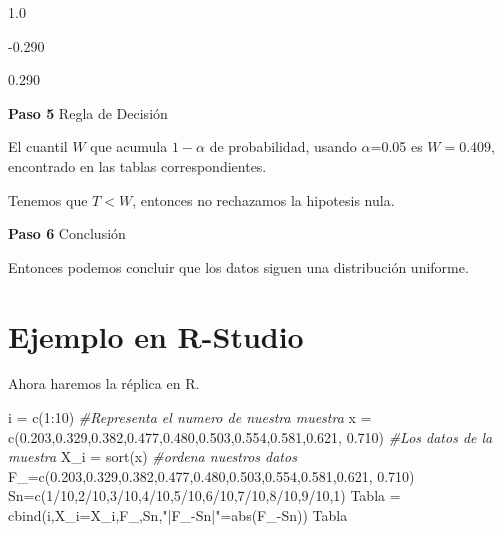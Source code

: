 \documentclass[
  a4paper,
  oneside,
  openany]{book}
\newenvironment{Shaded}{\begin{snugshade}}{\end{snugshade}}
\newcommand{\AttributeTok}[1]{\textcolor[rgb]{0.77,0.63,0.00}{#1}}
\newcommand{\CommentTok}[1]{\textcolor[rgb]{0.56,0.35,0.01}{\textit{#1}}}
\newcommand{\DecValTok}[1]{\textcolor[rgb]{0.00,0.00,0.81}{#1}}
\newcommand{\FloatTok}[1]{\textcolor[rgb]{0.00,0.00,0.81}{#1}}
\newcommand{\FunctionTok}[1]{\textcolor[rgb]{0.00,0.00,0.00}{#1}}
\newcommand{\NormalTok}[1]{#1}
\newcommand{\OtherTok}[1]{\textcolor[rgb]{0.56,0.35,0.01}{#1}}
\newcommand{\SpecialCharTok}[1]{\textcolor[rgb]{0.00,0.00,0.00}{#1}}
\newcommand{\StringTok}[1]{\textcolor[rgb]{0.31,0.60,0.02}{#1}}
\begin{document}
1.0

-0.290

0.290

\textbf{Paso 5} Regla de Decisión

El cuantil \(W\) que acumula \(1-\alpha\) de probabilidad, usando \(\alpha\)=0.05 es \(W=0.409\), encontrado en las tablas correspondientes.

Tenemos que \(T<W\), entonces no rechazamos la hipotesis nula.

\textbf{Paso 6} Conclusión

Entonces podemos concluir que los datos siguen una distribución uniforme.

\hypertarget{ejemplo-en-r-studio-14}{%
\section{Ejemplo en R-Studio}\label{ejemplo-en-r-studio-14}}

Ahora haremos la réplica en R.

\begin{Shaded}
\begin{Highlighting}[]
\NormalTok{i }\OtherTok{=} \FunctionTok{c}\NormalTok{(}\DecValTok{1}\SpecialCharTok{:}\DecValTok{10}\NormalTok{) }\CommentTok{\#Representa el numero de nuestra muestra}
\NormalTok{x }\OtherTok{=} \FunctionTok{c}\NormalTok{(}\FloatTok{0.203}\NormalTok{,}\FloatTok{0.329}\NormalTok{,}\FloatTok{0.382}\NormalTok{,}\FloatTok{0.477}\NormalTok{,}\FloatTok{0.480}\NormalTok{,}\FloatTok{0.503}\NormalTok{,}\FloatTok{0.554}\NormalTok{,}\FloatTok{0.581}\NormalTok{,}\FloatTok{0.621}\NormalTok{, }\FloatTok{0.710}\NormalTok{) }\CommentTok{\#Los datos de la muestra}
\NormalTok{X\_i }\OtherTok{=} \FunctionTok{sort}\NormalTok{(x) }\CommentTok{\#ordena nuestros datos}
\NormalTok{F\_}\OtherTok{=}\FunctionTok{c}\NormalTok{(}\FloatTok{0.203}\NormalTok{,}\FloatTok{0.329}\NormalTok{,}\FloatTok{0.382}\NormalTok{,}\FloatTok{0.477}\NormalTok{,}\FloatTok{0.480}\NormalTok{,}\FloatTok{0.503}\NormalTok{,}\FloatTok{0.554}\NormalTok{,}\FloatTok{0.581}\NormalTok{,}\FloatTok{0.621}\NormalTok{, }\FloatTok{0.710}\NormalTok{)}
\NormalTok{Sn}\OtherTok{=}\FunctionTok{c}\NormalTok{(}\DecValTok{1}\SpecialCharTok{/}\DecValTok{10}\NormalTok{,}\DecValTok{2}\SpecialCharTok{/}\DecValTok{10}\NormalTok{,}\DecValTok{3}\SpecialCharTok{/}\DecValTok{10}\NormalTok{,}\DecValTok{4}\SpecialCharTok{/}\DecValTok{10}\NormalTok{,}\DecValTok{5}\SpecialCharTok{/}\DecValTok{10}\NormalTok{,}\DecValTok{6}\SpecialCharTok{/}\DecValTok{10}\NormalTok{,}\DecValTok{7}\SpecialCharTok{/}\DecValTok{10}\NormalTok{,}\DecValTok{8}\SpecialCharTok{/}\DecValTok{10}\NormalTok{,}\DecValTok{9}\SpecialCharTok{/}\DecValTok{10}\NormalTok{,}\DecValTok{1}\NormalTok{)}
\NormalTok{Tabla }\OtherTok{=} \FunctionTok{cbind}\NormalTok{(i,}\AttributeTok{X\_i=}\NormalTok{X\_i,F\_,Sn,}\StringTok{"|F\_{-}Sn|"}\OtherTok{=}\FunctionTok{abs}\NormalTok{(F\_}\SpecialCharTok{{-}}\NormalTok{Sn))}
\NormalTok{Tabla}
\end{Highlighting}
\end{Shaded}
\end{document}

